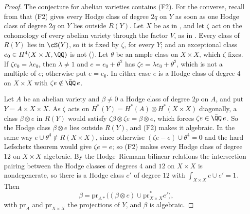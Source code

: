 \begin{proof}
The conjecture for abelian varieties contains (F2). For the converse, recall
from  that (F2) gives every Hodge class of degree $2q$ on
$Y$ as soon as one Hodge class of degree $2q$ on $Y$ lies outside $R(Y)$. Let
$X$ be as in , and let $\zeta$ act on the cohomology of
every abelian variety through the factor $V$, as in .
Every class of $R(Y)$ lies in $\cS(Y)$, so it is fixed by $\zeta$, for every
$Y$; and an exceptional class $e_{0}\in H^{4}(X\times X,\QQ)$ is not
(). Let $\theta$ be an ample class on $X\times X$,
which $\zeta$ fixes. If $\zeta e_{0}=\lambda e_{0}$, then $\lambda\ne1$ and
$e=e_{0}+\theta^{2}$ has $\zeta e=\lambda e_{0}+\theta^{2}$, which is not a
multiple of $e$; otherwise put $e=e_{0}$. In either case $e$ is a Hodge class
of degree $4$ on $X\times X$ with $\zeta e\notin\bar{\QQ}\,e$.

Let $A$ be an abelian variety and $\beta\ne0$ a Hodge class of degree $2p$ on
$A$, and put $Y=A\times X\times X$. As $\zeta$ acts on
$H^{*}(Y)=H^{*}(A)\otimes H^{*}(X\times X)$ diagonally, a class
$\beta\otimes e$ in $R(Y)$ would satisfy
$\zeta\beta\otimes\zeta e=\beta\otimes e$, which forces $\zeta e\in\bar{\QQ}\,e$.
So the Hodge class $\beta\otimes e$ lies outside $R(Y)$, and (F2) makes it
algebraic. In the same way $e\cup\theta^{4}\notin R(X\times X)$, since
otherwise $(\zeta e-e)\cup\theta^{4}=0$ and the hard Lefschetz theorem would
give $\zeta e=e$; so (F2) makes every Hodge class of degree $12$ on
$X\times X$ algebraic. By the Hodge--Riemann bilinear relations the
intersection pairing between the Hodge classes of degrees $4$ and $12$ on
$X\times X$ is nondegenerate, so there is a Hodge class $e'$ of degree $12$
with $\int_{X\times X}e\cup e'=1$. Then
\[
  \beta=\mathrm{pr}_{A*}\bigl((\beta\otimes e)\cup
  \mathrm{pr}_{X\times X}^{*}e'\bigr),
\]
with $\mathrm{pr}_{A}$ and $\mathrm{pr}_{X\times X}$ the projections of $Y$,
and $\beta$ is algebraic.
\end{proof}

